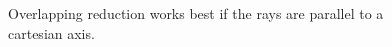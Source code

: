 \documentclass{PoliMi_MasterThesis}
\begin{document}
\begin{figure}[H]
    \centering
	\qquad
	\caption{Overlapping reduction works best if the rays are parallel to a cartesian axis.}
    \label{fig:overlapping_avoidance_parallel_vs_oblique}
\end{figure}
\end{document}
